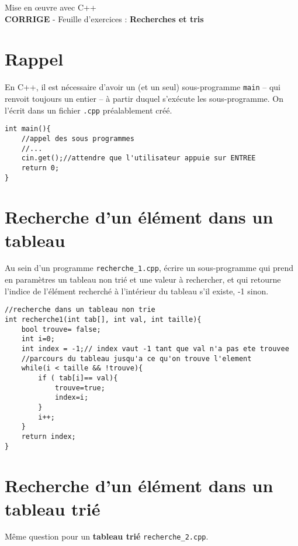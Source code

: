 \documentclass[french]{article}
\begin{document}
	
	\begin{minipage}{\textwidth}
\begin{center}

{\Large Mise en œuvre avec C++ \\ {\color{red}\textbf{CORRIGE}} - Feuille d'exercices : \textbf{Recherches et tris}}
\end{center}
	\end{minipage}
	
\section*{Rappel}
En C++, il est nécessaire d'avoir un (et un seul) sous-programme \texttt{main} -- qui renvoit toujours un entier -- à partir duquel s'exécute les sous-programme. On l'écrit dans un fichier \texttt{.cpp} préalablement créé.
\begin{lstlisting}[caption={Exemple de main dans recherche1.cpp}]
int main(){
    //appel des sous programmes
    //...
    cin.get();//attendre que l'utilisateur appuie sur ENTREE
    return 0;
}    
\end{lstlisting}

\section{Recherche d'un élément dans un tableau}

	Au sein d’un programme \texttt{recherche\_1.cpp}, écrire un sous-programme qui prend en paramètres un tableau non trié et une valeur à rechercher, et qui retourne l’indice de l’élément recherché à l’intérieur du tableau s’il existe, -1 sinon.
	
	
\begin{lstlisting}[caption={Recherche dans un tableau non trie}]
//recherche dans un tableau non trie
int recherche1(int tab[], int val, int taille){
    bool trouve= false;
    int i=0;
    int index = -1;// index vaut -1 tant que val n'a pas ete trouvee
    //parcours du tableau jusqu'a ce qu'on trouve l'element
    while(i < taille && !trouve){
        if ( tab[i]== val){
            trouve=true;
            index=i;
        }
        i++;
    }
    return index;
}
	\end{lstlisting}
\section{Recherche d'un élément dans un tableau trié}
	Même question pour un \textbf{tableau trié} \texttt{recherche\_2.cpp}.
	
\end{document}
